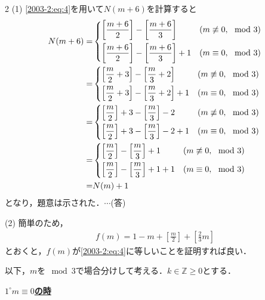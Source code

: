 \documentclass[../../main.tex]{subfiles}
\begin{document}
\begin{multicols}{2}
  \vspace{10pt}
  (1)
  \cref{2003-2:eq:4}を用いて$N(m+6)$を計算すると
  \begin{align*}
    N(m+6) =
      & \begin{dcases}
          \left[\frac{m+6}{2}\right] - \left[\frac{m+6}{3}\right]     & (m \not\equiv 0, \mod 3) \\
          \left[\frac{m+6}{2}\right] - \left[\frac{m+6}{3}\right] + 1 & (m \equiv 0, \mod 3)
        \end{dcases}      \\
    = & \begin{dcases}
          \left[\frac{m}{2}+3\right] - \left[\frac{m}{3}+2\right]     & (m \not\equiv 0, \mod 3) \\
          \left[\frac{m}{2}+3\right] - \left[\frac{m}{3}+2\right] + 1 & (m \equiv 0, \mod 3)
        \end{dcases}  \\
    = & \begin{dcases}
          \left[\frac{m}{2}\right]+3 - \left[\frac{m}{3}\right]-2      & (m \not\equiv 0, \mod 3) \\
          \left[\frac{m}{2}\right]+3 - \left[\frac{m}{3}\right] -2 + 1 & (m \equiv 0, \mod 3)
        \end{dcases} \\
    = & \begin{dcases}
          \left[\frac{m}{2}\right] - \left[\frac{m}{3}\right] + 1    & (m \not\equiv 0, \mod 3) \\
          \left[\frac{m}{2}\right] - \left[\frac{m}{3}\right] +1 + 1 & (m \equiv 0, \mod 3)
        \end{dcases}   \\
    = & N(m) + 1
  \end{align*}
  となり，題意は示された．$\cdots$(答)

  \vspace{10pt}
  (2)
  簡単のため，
  \begin{align*}
    f(m) = 1-m+\left[\frac{m}{2}\right]+\left[\frac{2}{3}m\right]
  \end{align*}
  とおくと，$f(m)$が\cref{2003-2:eq:4}に等しいことを証明すれば良い．

  以下，$m$を$\mod 3$で場合分けして考える．$k\in\mathbb{Z} \ge 0$とする．

  \vspace{5pt}
  \underline{\textbf{$1^{\circ} m \equiv 0$の時}}


\end{multicols}
\end{document}
